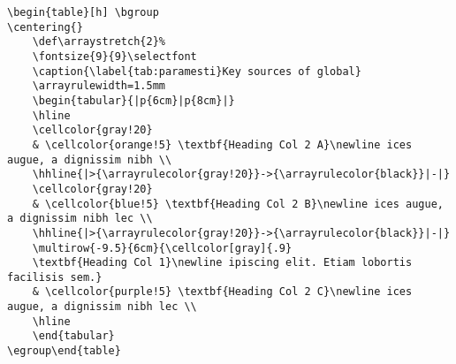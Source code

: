 \documentclass[12pt,english]{article}
\begin{document}
\begin{scriptsize}
\begin{verbatim}
\begin{table}[h] \bgroup
\centering{}
    \def\arraystretch{2}%
    \fontsize{9}{9}\selectfont
    \caption{\label{tab:paramesti}Key sources of global}
    \arrayrulewidth=1.5mm
    \begin{tabular}{|p{6cm}|p{8cm}|}
    \hline
    \cellcolor{gray!20} 
    & \cellcolor{orange!5} \textbf{Heading Col 2 A}\newline ices augue, a dignissim nibh \\
    \hhline{|>{\arrayrulecolor{gray!20}}->{\arrayrulecolor{black}}|-|}
    \cellcolor{gray!20}
    & \cellcolor{blue!5} \textbf{Heading Col 2 B}\newline ices augue, a dignissim nibh lec \\
    \hhline{|>{\arrayrulecolor{gray!20}}->{\arrayrulecolor{black}}|-|}
    \multirow{-9.5}{6cm}{\cellcolor[gray]{.9}
    \textbf{Heading Col 1}\newline ipiscing elit. Etiam lobortis facilisis sem.}
    & \cellcolor{purple!5} \textbf{Heading Col 2 C}\newline ices augue, a dignissim nibh lec \\
    \hline
    \end{tabular}
\egroup\end{table}    
\end{verbatim}
\end{scriptsize}
\end{document}
